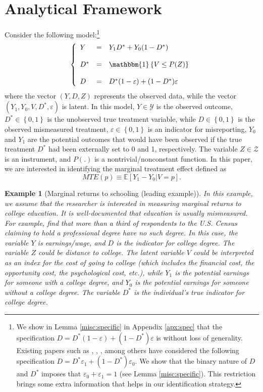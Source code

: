 \documentclass[11pt,reqno]{amsart}
\theoremstyle{plain}
\newtheorem{example}{Example}
\numberwithin{equation}{section}
\begin{document}
\clearpage
\section{Analytical Framework}\label{anaF}
Consider the following model:\footnote{We show in Lemma \ref{misc:specific} in Appendix \ref{apx:spec} that the specification $D=D^* (1-\varepsilon) +(1-D^*)\varepsilon$ is without loss of generality. Existing papers such as \cite{Ura2018}, \cite{Calvi_al2018}, \cite{Tommasi2020}, among others have considered the following specification $D=D^* \varepsilon_1 +(1-D^*)\varepsilon_0$. We show that the binary nature of $D$ and $D^*$ imposes that $\varepsilon_0+\varepsilon_1=1$ (see Lemma \ref{misc:specific}). This restriction brings some extra information that helps in our identification strategy.}
\begin{eqnarray}\label{seq1}
\left\{ \begin{array}{lcl}
     Y&=&Y_1D^*+Y_0(1-D^*)\\ \\
     D^*&=&\mathbbm{1}\left\{V\leq P(Z)\right\}\\ \\
     D&=&D^* (1-\varepsilon) +(1-D^*)	 \varepsilon
     \end{array} \right.
\end{eqnarray}
where the vector $(Y,D,Z)$ represents the observed data, while the vector $(Y_1, Y_0, V, D^*,\varepsilon)$ is latent. In this model, $Y \in \mathcal Y$ is the observed outcome, $D^*\in \left\{0,1\right\}$ is the unobserved true treatment variable, while $D\in \left\{0,1\right\}$ is the observed mismeasured treatment, $\varepsilon \in \left\{0,1\right\}$ is an indicator for misreporting, $Y_0$ and $Y_1$ are the potential outcomes that would have been observed if the true treatment $D^*$ had been externally set to 0 and 1, respectively. The variable $Z \in \mathcal Z$ is an instrument, and $P(.)$ is a nontrivial/nonconstant function. In this paper, we are interested in identifying the marginal treatment effect defined as 
$$MTE(p)\equiv \mathbb E[Y_1-Y_0\vert V=p].$$

\begin{example}[Marginal returns to schooling (leading example)]\label{ex1}
In this example, we assume that the researcher is interested in measuring marginal returns to college education. It is well-documented that education is usually mismeasured. For example, \cite{Black_etal2003} find that more than a third of respondents to the U.S. Census claiming to hold a professional degree have no such  degree. In this case, the variable $Y$ is earnings/wage, and $D$ is the indicator for college degree. The variable $Z$ could be distance to college. The latent variable $V$ could be interpreted as an index for the cost of going to college (which includes the financial cost, the opportunity cost, the psychological cost, etc.), while $Y_1$ is the potential earnings for someone with a college degree, and $Y_0$ is the potential earnings for someone without a college degree. The variable $D^*$ is the individual's true indicator for college degree. 
\end{example}
\end{document}
